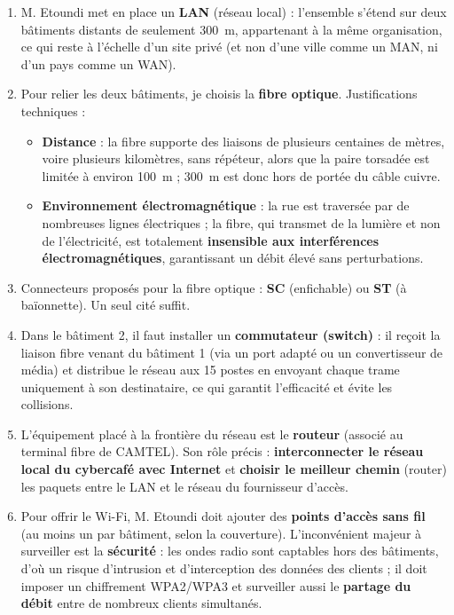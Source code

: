 \documentclass[11pt]{article}
\newcommand{\cle}[1]{{\popxbold\color{popdark}#1}}
\begin{document}
\begin{corrige}
\begin{enumerate}
  \item M. Etoundi met en place un \textbf{\cle{LAN}} (réseau local) : l'ensemble s'étend sur deux bâtiments distants de seulement \SI{300}{m}, appartenant à la même organisation, ce qui reste à l'échelle d'un site privé (et non d'une ville comme un MAN, ni d'un pays comme un WAN).
  \item Pour relier les deux bâtiments, je choisis la \textbf{\cle{fibre optique}}. Justifications techniques :
  \begin{itemize}
    \item \textbf{Distance} : la fibre supporte des liaisons de plusieurs centaines de mètres, voire plusieurs kilomètres, sans répéteur, alors que la \cle{paire torsadée} est limitée à environ \SI{100}{m} ; \SI{300}{m} est donc hors de portée du câble cuivre.
    \item \textbf{Environnement électromagnétique} : la rue est traversée par de nombreuses lignes électriques ; la fibre, qui transmet de la lumière et non de l'électricité, est totalement \textbf{insensible aux interférences électromagnétiques}, garantissant un débit élevé sans perturbations.
  \end{itemize}
  \item Connecteurs proposés pour la fibre optique : \textbf{\cle{SC}} (enfichable) ou \textbf{\cle{ST}} (à baïonnette). Un seul cité suffit.
  \item Dans le bâtiment 2, il faut installer un \textbf{\cle{commutateur} (switch)} : il reçoit la liaison fibre venant du bâtiment 1 (via un port adapté ou un \cle{convertisseur de média}) et distribue le réseau aux 15 postes en envoyant chaque trame uniquement à son destinataire, ce qui garantit l'efficacité et évite les collisions.
  \item L'équipement placé à la frontière du réseau est le \textbf{\cle{routeur}} (associé au terminal fibre de CAMTEL). Son rôle précis : \textbf{interconnecter le réseau local du cybercafé avec Internet} et \textbf{choisir le meilleur chemin} (router) les paquets entre le LAN et le réseau du fournisseur d'accès.
  \item Pour offrir le Wi-Fi, M. Etoundi doit ajouter des \textbf{\cle{points d'accès sans fil}} (au moins un par bâtiment, selon la couverture). L'inconvénient majeur à surveiller est la \textbf{sécurité} : les ondes radio sont captables hors des bâtiments, d'où un risque d'intrusion et d'interception des données des clients ; il doit imposer un chiffrement WPA2/WPA3 et surveiller aussi le \textbf{partage du débit} entre de nombreux clients simultanés.

\end{enumerate}
\end{corrige}
\end{document}
